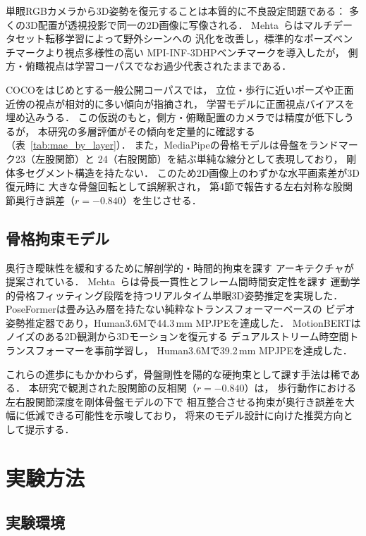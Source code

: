 \documentclass[fleqn]{ieej}
\begin{document}
単眼RGBカメラから3D姿勢を復元することは本質的に不良設定問題である：
多くの3D配置が透視投影で同一の2D画像に写像される．
Mehta~ら\cite{mehta2017}はマルチデータセット転移学習によって野外シーンへの
汎化を改善し，標準的なポーズベンチマークより視点多様性の高い
MPI-INF-3DHPベンチマークを導入したが，
側方・俯瞰視点は学習コーパスでなお過少代表されたままである．

COCO\cite{coco}をはじめとする一般公開コーパスでは，
立位・歩行に近いポーズや正面近傍の視点が相対的に多い傾向が指摘され，
学習モデルに正面視点バイアスを埋め込みうる．
この仮説のもと，側方・俯瞰配置のカメラでは精度が低下しうるが，
本研究の多層評価がその傾向を定量的に確認する（表~\ref{tab:mae_by_layer}）．
また，MediaPipeの骨格モデルは骨盤をランドマーク23（左股関節）と
24（右股関節）を結ぶ単純な線分として表現しており，
剛体多セグメント構造を持たない．
このため2D画像上のわずかな水平画素差が3D復元時に
大きな骨盤回転として誤解釈され，
第4節で報告する左右対称な股関節奥行き誤差（$r=-0.840$）を生じさせる．

\subsection{骨格拘束モデル}

奥行き曖昧性を緩和するために解剖学的・時間的拘束を課す
アーキテクチャが提案されている．
Mehta~ら\cite{vnect}は骨長一貫性とフレーム間時間安定性を課す
運動学的骨格フィッティング段階を持つリアルタイム単眼3D姿勢推定を実現した．
PoseFormer\cite{poseformer}は畳み込み層を持たない純粋なトランスフォーマーベースの
ビデオ姿勢推定器であり，Human3.6Mで44.3\,mm MPJPEを達成した．
MotionBERT\cite{motionbert}はノイズのある2D観測から3Dモーションを復元する
デュアルストリーム時空間トランスフォーマーを事前学習し，
Human3.6Mで39.2\,mm MPJPEを達成した．

これらの進歩にもかかわらず，骨盤剛性を陽的な硬拘束として課す手法は稀である．
本研究で観測された股関節の反相関（$r=-0.840$）は，
歩行動作における左右股関節深度を剛体骨盤モデルの下で
相互整合させる拘束が奥行き誤差を大幅に低減できる可能性を示唆しており，
将来のモデル設計に向けた推奨方向として提示する．

\section{実験方法}

\subsection{実験環境}
\end{document}
